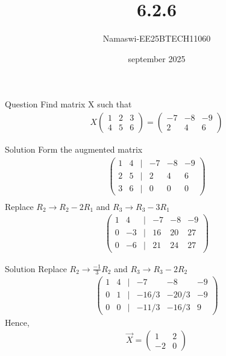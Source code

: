 \documentclass{beamer}
\begin{document}
\title 
{6.2.6}
\date{september 2025}
\author 
{Namaswi-EE25BTECH11060}
\frame{\titlepage}
\begin{frame}{Question}
Find matrix X such that\\
\begin{align}
   X \begin{pmatrix}
        1 & 2 & 3\\
        4 & 5 & 6
    \end{pmatrix}= \begin{pmatrix}
        -7 & -8 & -9 \\ 2 & 4 & 6
    \end{pmatrix}
\end{align}
 \end{frame}
\begin{frame}{Solution}
Form the augmented matrix  
\begin{align}
   \begin{pmatrix}
1 & 4 & | & -7 & -8 & -9 \\
2 & 5 & | & 2 & 4 & 6 \\
3 & 6 & | & 0 & 0 & 0
\end{pmatrix} \\ 
\end{align}
Replace $R_2 \to R_2-2R_1 $ and $R_3 \to R_3-3R_1$
\begin{align}
\begin{pmatrix}
1 & 4 & | & -7 & -8 & -9 \\
0 & -3 & | & 16 & 20 & 27 \\
0 & -6 & | & 21 & 24 & 27
\end{pmatrix} 
\end{align}
\end{frame}
\begin{frame}{Solution}
Replace $R_2 \to \frac{-1}{3}R_2$ and $R_3 \to R_3-2R_2$
\begin{align}
\begin{pmatrix}
1 & 4 & | & -7 & -8 & -9 \\
0 & 1 & | & -16/3 & -20/3 & -9 \\
0 & 0 & | & -11/3 & -16/3 & 9
\end{pmatrix}
\end{align}
Hence,
\begin{align}
    \Vec{X}=\begin{pmatrix}
    1 & 2\\
    -2 &  0
\end{pmatrix}
\end{align}
\end{frame}
\end{document}

